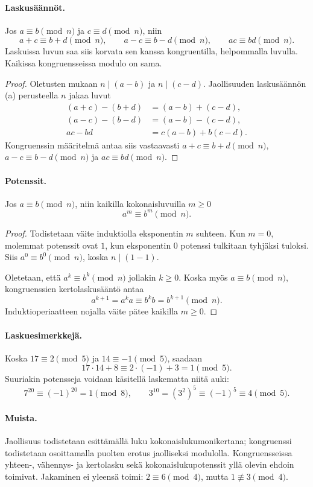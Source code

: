 \documentclass[11pt,a4paper]{amsart}
\begin{document}
\paragraph{Laskusäännöt.}
Jos $a\equiv b\pmod n$ ja $c\equiv d\pmod n$, niin
\[
  a+c\equiv b+d\pmod n,\qquad
  a-c\equiv b-d\pmod n,\qquad
  ac\equiv bd\pmod n.
\]
Laskuissa luvun saa siis korvata sen kanssa kongruentilla,
helpommalla luvulla. Kaikissa kongruensseissa modulo on sama.

\begin{proof}
  Oletusten mukaan $n\mid(a-b)$ ja $n\mid(c-d)$.
  Jaollisuuden laskusäännön (a) perusteella $n$ jakaa luvut
  \[
    \begin{aligned}
      (a+c)-(b+d)&=(a-b)+(c-d),\\
      (a-c)-(b-d)&=(a-b)-(c-d),\\
      ac-bd&=c(a-b)+b(c-d).
    \end{aligned}
  \]
  Kongruenssin määritelmä antaa siis vastaavasti
  $a+c\equiv b+d\pmod n$, $a-c\equiv b-d\pmod n$ ja
  $ac\equiv bd\pmod n$.
\end{proof}

\paragraph{Potenssit.}
Jos $a\equiv b\pmod n$, niin kaikilla kokonaisluvuilla $m\ge0$
\[
  a^m\equiv b^m\pmod n.
\]
\begin{proof}
  Todistetaan väite induktiolla eksponentin $m$ suhteen.
  Kun $m=0$, molemmat potenssit ovat $1$, kun eksponentin $0$
  potenssi tulkitaan tyhjäksi tuloksi. Siis $a^0\equiv b^0\pmod n$,
  koska $n\mid(1-1)$.

  Oletetaan, että $a^k\equiv b^k\pmod n$ jollakin $k\ge0$.
  Koska myös $a\equiv b\pmod n$, kongruenssien kertolaskusääntö antaa
  \[
    a^{k+1}=a^k a\equiv b^k b=b^{k+1}\pmod n.
  \]
  Induktioperiaatteen nojalla väite pätee kaikilla $m\ge0$.
\end{proof}

\paragraph{Laskuesimerkkejä.}
Koska $17\equiv2\pmod5$ ja $14\equiv-1\pmod5$, saadaan
\[
  17\cdot14+8\equiv2\cdot(-1)+3=1\pmod5.
\]
Suuriakin potensseja voidaan käsitellä laskematta niitä auki:
\[
  7^{20}\equiv(-1)^{20}=1\pmod8,
  \qquad
  3^{10}=(3^2)^5\equiv(-1)^5\equiv4\pmod5.
\]

\paragraph{Muista.}
Jaollisuus todistetaan esittämällä luku kokonaislukumonikertana;
kongruenssi todistetaan osoittamalla puolten erotus jaolliseksi
modulolla. Kongruensseissa yhteen-, vähennys- ja kertolasku sekä
kokonaislukupotenssit yllä olevin ehdoin toimivat. Jakaminen ei
yleensä toimi: $2\equiv6\pmod4$, mutta $1\not\equiv3\pmod4$.
\end{document}
